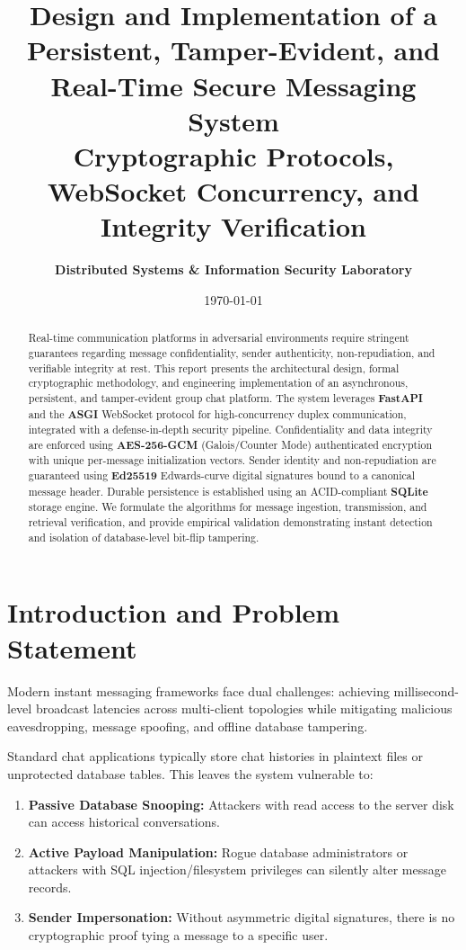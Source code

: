 \documentclass[11pt,a4paper]{article}
\title{\vspace{-1.5cm}\textbf{\huge Design and Implementation of a Persistent, Tamper-Evident, and Real-Time Secure Messaging System}\\[0.4cm]
\Large Cryptographic Protocols, WebSocket Concurrency, and Integrity Verification}
\author{\textbf{Distributed Systems \& Information Security Laboratory}}
\date{\today}
\begin{document}
\maketitle

\begin{abstract}
Real-time communication platforms in adversarial environments require stringent guarantees regarding message confidentiality, sender authenticity, non-repudiation, and verifiable integrity at rest. This report presents the architectural design, formal cryptographic methodology, and engineering implementation of an asynchronous, persistent, and tamper-evident group chat platform. The system leverages \textbf{FastAPI} and the \textbf{ASGI} WebSocket protocol for high-concurrency duplex communication, integrated with a defense-in-depth security pipeline. Confidentiality and data integrity are enforced using \textbf{AES-256-GCM} (Galois/Counter Mode) authenticated encryption with unique per-message initialization vectors. Sender identity and non-repudiation are guaranteed using \textbf{Ed25519} Edwards-curve digital signatures bound to a canonical message header. Durable persistence is established using an ACID-compliant \textbf{SQLite} storage engine. We formulate the algorithms for message ingestion, transmission, and retrieval verification, and provide empirical validation demonstrating instant detection and isolation of database-level bit-flip tampering.
\end{abstract}

\tableofcontents
\newpage

\section{Introduction and Problem Statement}
Modern instant messaging frameworks face dual challenges: achieving millisecond-level broadcast latencies across multi-client topologies while mitigating malicious eavesdropping, message spoofing, and offline database tampering. 

Standard chat applications typically store chat histories in plaintext files or unprotected database tables. This leaves the system vulnerable to:
\begin{enumerate}[label=(\roman*)]
    \item \textbf{Passive Database Snooping:} Attackers with read access to the server disk can access historical conversations.
    \item \textbf{Active Payload Manipulation:} Rogue database administrators or attackers with SQL injection/filesystem privileges can silently alter message records.
    \item \textbf{Sender Impersonation:} Without asymmetric digital signatures, there is no cryptographic proof tying a message to a specific user.
\end{enumerate}
\end{document}
